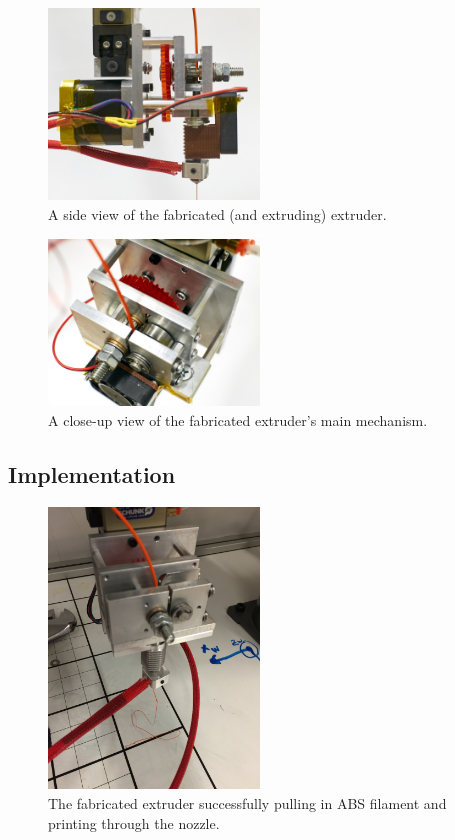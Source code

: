 \begin{figure}[h!]
\centering
\includegraphics[width=0.5\textwidth]{./figures/extruder-side-profile}
\caption{A side view of the fabricated (and extruding) extruder.}
\label{fig:extruder-side-profile}
\end{figure}

\begin{figure}[h!]
\centering
\includegraphics[width=0.5\textwidth]{./figures/extruder-mechanism}
\caption{A close-up view of the fabricated extruder's main mechanism.}
\label{fig:extruder-mechanism}
\end{figure}

\clearpage

\subsection{Implementation}

\indent

\begin{figure}[h!]
\centering
\includegraphics[width=0.5\textwidth]{./figures/extruder-abs-extrude}
\caption{The fabricated extruder successfully pulling in ABS filament and printing through the nozzle.}
\label{fig:extruder-abs-extrude}
\end{figure}
